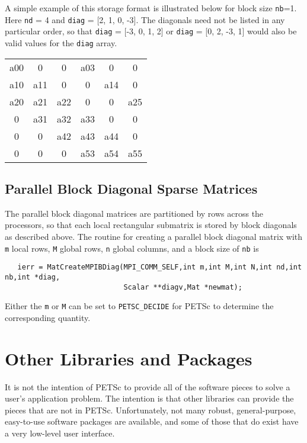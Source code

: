 A simple example of this storage format is illustrated below for block
size {\tt nb}=1. 
Here {\tt nd} = 4 and {\tt diag} = [2, 1, 0, -3]. The
diagonals need not be listed in any particular order, so that
{\tt diag} = [-3, 0, 1, 2] or {\tt diag} = [0, 2, -3, 1] would also
be valid values for the {\tt diag} array. 

\begin{center}
\begin{tabular}{| c c c c c c |}
\hline
a00  &0    &0    &a03  &0    &0\\
a10  &a11  &0    &0    &a14  &0\\
a20  &a21  &a22  &0    &0    &a25\\
0    &a31  &a32  &a33  &0    &0\\
0    &0    &a42  &a43  &a44  &0\\
0    &0    &0    &a53  &a54  &a55\\
\hline
\end{tabular}
\end{center}

\subsection{Parallel Block Diagonal Sparse Matrices}

The parallel block diagonal matrices are partitioned by rows across
the processors, so that each local rectangular submatrix is stored by
block diagonals as described above.  The routine for creating a
parallel block diagonal matrix with {\tt m} local rows, {\tt M} global
rows, {\tt n} global columns, and a block size of {\tt nb} is
\begin{verbatim}
   ierr = MatCreateMPIBDiag(MPI_COMM_SELF,int m,int M,int N,int nd,int nb,int *diag,
                            Scalar **diagv,Mat *newmat);
\end{verbatim}
Either the {\tt m} or {\tt M} can be set to {\tt PETSC\_DECIDE} for PETSc
to determine the corresponding quantity.

\section{Other Libraries and Packages}

It is not the intention of PETSc to provide all of the software pieces 
to solve a user's application problem. The intention is that other 
libraries can provide the pieces that are not in PETSc.  Unfortunately, 
not many robust, general-purpose, easy-to-use software packages 
are available, and some of those that do exist have a very low-level 
user interface. 

